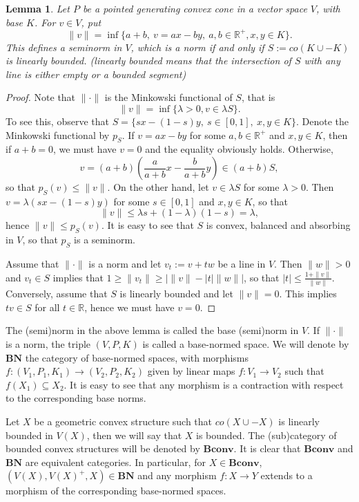 \documentclass[12pt]{article}
\newtheorem{lemma}{Lemma}
\newcommand{\<}{\langle}
\newcommand{\ct}[1]{\mathbf{#1}}
\begin{document}
\begin{lemma} Let $P$ be a pointed generating convex cone in a vector space $V$, with base $K$. For $v\in V$, put 
\[
\|v\|=\inf\{a+b,\ v=a x-b y,\ a,b\in \mathbb R^+, x,y\in K\}.
\]
This defines a seminorm in $V$, which is a norm if and only if $S:=co(K\cup -K)$ is linearly bounded. (linearly bounded means that the intersection of $S$ with any line is either empty or a bounded segment)

\end{lemma}

\begin{proof} Note that $\|\cdot\|$ is the Minkowski functional of $S$, that is
\[
\|v\|= \inf\{\lambda>0, v\in \lambda S\}.
\]
To see this, observe that $S=\{s x-(1-s)y,\ s\in [0,1],\ x,y\in K\}$. Denote the Minkowski functional by $p_S$. If $v=ax-by$ for some $a,b\in \mathbb R^+$ and $x,y\in K$, then if $a+b=0$, we must have 
$v=0$ and the equality obviously holds. Otherwise, 
\[
v=(a+b)(\frac a{a+b} x-\frac b{a+b} y)\in (a+b) S,
\]
so that $p_S(v)\le \|v\|$. On the other hand, let $v\in \lambda S$ for some $\lambda>0$. Then $v=\lambda(sx-(1-s)y)$ for some $s\in [0,1]$ and $x,y\in K$, so that 
\[
\|v\|\le \lambda s+(1-\lambda)(1-s)=\lambda,
\]
hence $\|v\|\le p_S(v)$. It is easy to see that $S$ is convex, balanced and absorbing in $V$, so that $p_S$ is a seminorm.  

Assume that $\|\cdot\|$ is a norm and let $v_t:=v+tw$ be a line in $V$. Then $\|w\|>0$ and $v_t\in  S$ implies that $1\ge \|v_t\|\ge |\|v\|-|t|\|w\||$, so that $|t|\le \tfrac{1+\|v\|}{\|w\|}$. Conversely, assume that $S$ is linearly bounded and let $\|v\|=0$. This implies $tv\in S$ for all $t\in \mathbb R$, hence we must have $v=0$. 

\end{proof}



The (semi)norm in the above lemma is called  the base (semi)norm in $V$. If $\|\cdot\|$ is a norm, the triple $(V,P,K)$ is called a base-normed space. We will denote 
by $\ct{BN}$ the category of base-normed spaces, with morphisms $f: (V_1,P_1,K_1)\to (V_2,P_2,K_2)$ given by linear maps $f:V_1\to V_2$ such that $f(X_1)\subseteq X_2$. It is easy to see that any morphism is a contraction with respect to the corresponding base norms.



Let $X$ be a geometric convex structure such that $co(X\cup -X)$ is linearly bounded in $V(X)$, then we will say that $X$ is bounded.
 The (sub)category of  bounded convex structures will be denoted by $\ct{Bconv}$. It is clear that $\ct{Bconv}$ and $\ct{BN}$ are equivalent categories. In particular,
for $X\in \ct{Bconv}$, $(V(X),V(X)^+,X)\in \ct{BN}$ and any morphism $f:X\to Y$ extends to a morphism of the corresponding base-normed spaces. 
\end{document}
